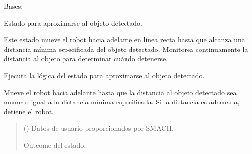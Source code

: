 \documentclass[a4paper,10pt,spanish]{sphinxmanual}
\begin{document}
\begin{fulllineitems}
\label{\detokenize{squad_approach_control_action:squad_approach_control_action.ApproachObjectState}}
\pysigstartsignatures
{}
\pysigstopsignatures
\sphinxAtStartPar
Bases: 

\sphinxAtStartPar
Estado para aproximarse al objeto detectado.

\sphinxAtStartPar
Este estado mueve el robot hacia adelante en línea recta hasta que alcanza una distancia
mínima especificada del objeto detectado. Monitorea continuamente la distancia al objeto
para determinar cuándo detenerse.

\begin{fulllineitems}
\label{\detokenize{squad_approach_control_action:squad_approach_control_action.ApproachObjectState.execute}}
\pysigstartsignatures
{}
\pysigstopsignatures
\sphinxAtStartPar
Ejecuta la lógica del estado para aproximarse al objeto detectado.

\sphinxAtStartPar
Mueve el robot hacia adelante hasta que la distancia al objeto detectado sea menor o
igual a la distancia mínima especificada. Si la distancia es adecuada, detiene el robot.
\begin{quote}\begin{description}
\sphinxAtStartPar
{} () \textendash{} Datos de usuario proporcionados por SMACH.

\sphinxAtStartPar
Outcome del estado.

\sphinxAtStartPar
{}


\end{description}
\end{quote}
\end{fulllineitems}
\end{fulllineitems}
\end{document}
